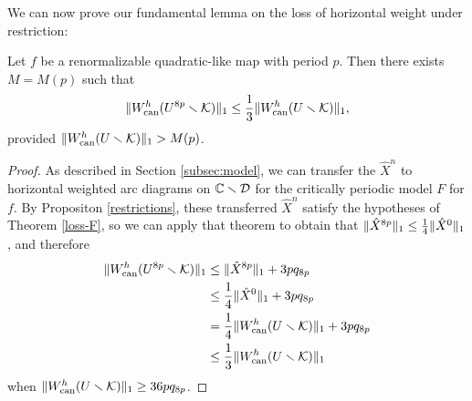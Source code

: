 We can now prove our fundamental lemma on the loss of horizontal weight under restriction:
\begin{theorem}\label{loss of hor weight}
  Let $f$ be a renormalizable quadratic-like map with period $p$.
Then there exists $M=M(p)$ such that
$$
     \| W^h_{\mathrm{can}}(U^{8p}\smallsetminus {\mathcal K}) \|_1\leq \frac{1}{3} \| W^h_{\mathrm{can}}(U\smallsetminus {\mathcal K})\|_1,
$$
provided $ \| W^h_{\mathrm{can}}(U\smallsetminus {\mathcal K})\|_1>M(p)$.
\end{theorem}

\begin{proof}
As described in Section \ref{subsec:model},
we can transfer the $\hat X^n$ to horizontal weighted arc diagrams on ${\Bbb C} \smallsetminus {\mathcal D}$ for the critically periodic model $F$ for 
$f$.
By Propositon \ref{restrictions},
these transferred $\hat X^n$ satisfy the hypotheses of Theorem \ref{loss-F},
so we can apply that theorem to obtain that $\Vert \hat X^{8p} \Vert_1 \le \frac14\Vert \hat X^0 \Vert_1$, 
and therefore
\begin{align*}
   \| W^h_{\mathrm{can}}(U^{8p}\smallsetminus {\mathcal K}) \|_1&\le \Vert \hat X^{8p} \Vert_1 + 3pq_{8p} \\
&\le \frac14\Vert \hat X^0 \Vert_1 + 3pq_{8p} \\
&=    \frac{1}{4} \| W^h_{\mathrm{can}}(U\smallsetminus {\mathcal K})\|_1 + 3pq_{8p} \\
& \le \frac{1}{3} \| W^h_{\mathrm{can}}(U\smallsetminus {\mathcal K})\|_1
\end{align*}
when $ \| W^h_{\mathrm{can}}(U\smallsetminus {\mathcal K})\|_1 \ge 36p q_{8p}$. 
\end{proof}



